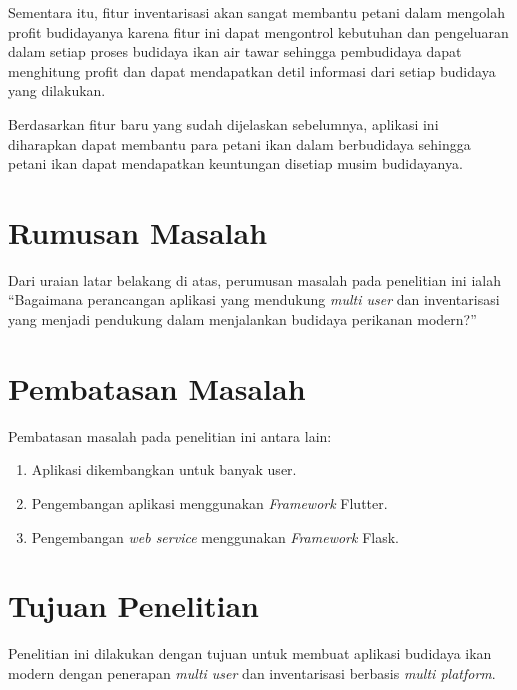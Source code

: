 Sementara itu, fitur inventarisasi akan sangat membantu petani dalam mengolah profit budidayanya karena fitur ini dapat mengontrol kebutuhan dan pengeluaran dalam setiap proses budidaya ikan air tawar sehingga pembudidaya dapat menghitung profit dan dapat mendapatkan detil informasi dari setiap budidaya yang dilakukan.

Berdasarkan fitur baru yang sudah dijelaskan sebelumnya, aplikasi ini diharapkan dapat membantu para petani ikan dalam berbudidaya sehingga petani ikan dapat mendapatkan keuntungan disetiap musim budidayanya.


\section{Rumusan Masalah}
Dari uraian latar belakang di atas, perumusan masalah pada penelitian ini ialah “Bagaimana perancangan aplikasi yang mendukung \emph{multi user} dan inventarisasi yang menjadi pendukung dalam menjalankan budidaya perikanan modern?”

\section{Pembatasan Masalah}
Pembatasan masalah pada penelitian ini antara lain:
\begin{enumerate}
	\item Aplikasi dikembangkan untuk banyak user.
	\item Pengembangan aplikasi menggunakan \emph{Framework} Flutter.
	\item Pengembangan \emph{web service} menggunakan \emph{Framework} Flask.
\end{enumerate}

\section{Tujuan Penelitian}
	Penelitian ini dilakukan dengan tujuan untuk membuat aplikasi budidaya ikan modern dengan penerapan \emph{multi user} dan inventarisasi berbasis \emph{multi platform}.

